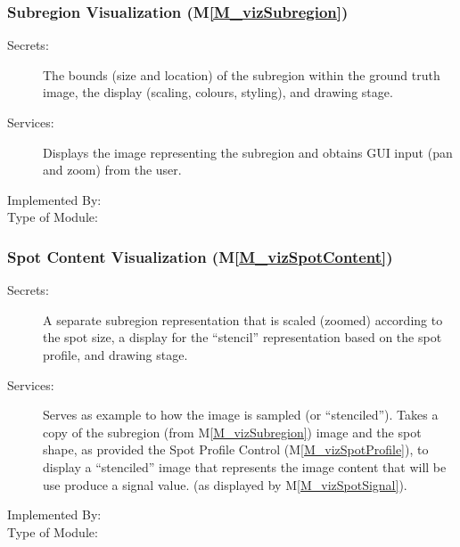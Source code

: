 \documentclass[12pt, titlepage]{article}
\newcommand{\mref}[1]{M\ref{#1}}
\begin{document}
\subsubsection{Subregion Visualization (\mref{M_vizSubregion})}
\begin{description}
\item[Secrets:]The bounds (size and location) of the subregion within the ground truth image,
  the display (scaling, colours, styling), and drawing stage.
\item[Services:]Displays the image representing the subregion and obtains GUI
  input (pan and zoom) from the user.
\item[Implemented By:] \progname{}
\item[Type of Module:] 
\end{description}


\subsubsection{Spot Content Visualization (\mref{M_vizSpotContent})}
\begin{description}
\item[Secrets:]A separate subregion representation that is scaled (zoomed) according to
  the spot size, a display for the ``stencil'' representation based on the spot profile,
  and drawing stage.
\item[Services:]Serves as example to how the image is sampled (or ``stenciled'').
  Takes a copy of the subregion (from \mref{M_vizSubregion}) image and the spot shape, 
  as provided the Spot Profile Control (\mref{M_vizSpotProfile}), to display a ``stenciled'' image
  that represents the image content that will be use produce a signal value.
  (as displayed by \mref{M_vizSpotSignal}).
\item[Implemented By:] \progname{}
\item[Type of Module:] 
\end{description}
\end{document}
